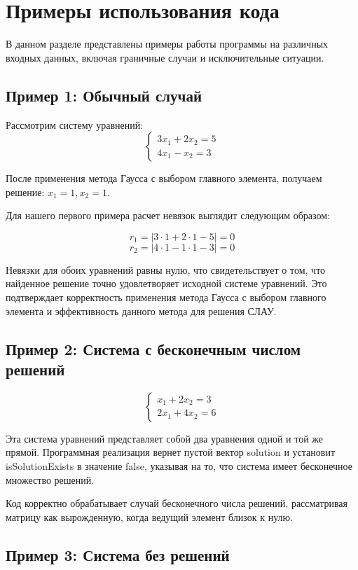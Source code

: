 \section{Примеры использования кода}

В данном разделе представлены примеры работы программы на различных входных данных, включая граничные случаи и исключительные ситуации.

\subsection{Пример 1: Обычный случай}

Рассмотрим систему уравнений:
\[
\begin{cases} 
3x_1 + 2x_2 = 5 \\ 
4x_1 - x_2 = 3
\end{cases}
\]

После применения метода Гаусса с выбором главного элемента, получаем решение: $x_1 = 1, x_2 = 1$.

Для нашего первого примера расчет невязок выглядит следующим образом:

\[
r_1 = |3 \cdot 1 + 2 \cdot 1 - 5| = 0
\]
\[
r_2 = |4 \cdot 1 - 1 \cdot 1 - 3| = 0
\]

Невязки для обоих уравнений равны нулю, что свидетельствует о том, что найденное решение точно удовлетворяет исходной системе уравнений. Это подтверждает корректность применения метода Гаусса с выбором главного элемента и эффективность данного метода для решения СЛАУ.

\subsection{Пример 2: Система с бесконечным числом решений}

\[
\begin{cases} 
x_1 + 2x_2 = 3 \\ 
2x_1 + 4x_2 = 6
\end{cases}
\]

Эта система уравнений представляет собой два уравнения одной и той же прямой. Программная реализация вернет пустой вектор solution и установит isSolutionExists в значение false, указывая на то, что система имеет бесконечное множество решений.

Код корректно обрабатывает случай бесконечного числа решений, рассматривая матрицу как вырожденную, когда ведущий элемент близок к нулю. 

\subsection{Пример 3: Система без решений}

